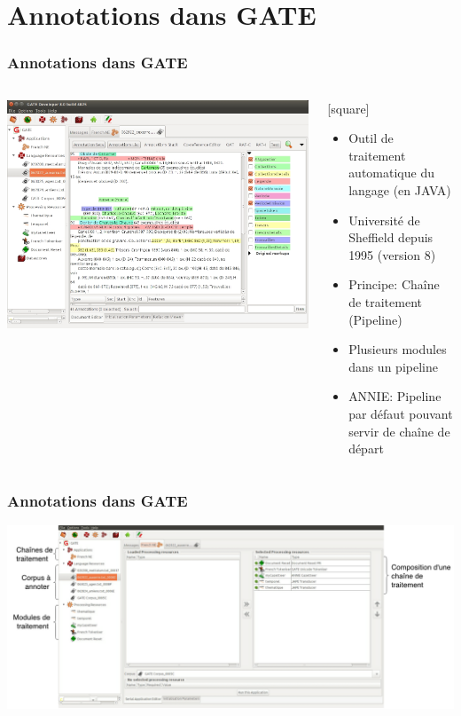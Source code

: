 \documentclass[10pt, compress]{beamer}
\begin{document}
\section{Annotations dans GATE}
\begin{frame}[fragile]
\frametitle{Annotations dans GATE}
\begin{columns}
	\begin{center}
	\includegraphics[scale=0.190]{img/gate.png} 
	\end{center}
	\begin{scriptsize}
		[square]
	\begin{itemize}
		\item{Outil de traitement automatique du langage (en JAVA)}
		\item{Université de Sheffield depuis 1995 (version 8)}
		\item{Principe: Chaîne de traitement (Pipeline)}
		\item{Plusieurs modules dans un pipeline}
		\item{ANNIE: Pipeline par défaut pouvant servir de chaîne de départ}
	\end{itemize}
	\end{scriptsize}
\end{columns}
\end{frame}

\begin{frame}[fragile]
\frametitle{Annotations dans GATE}
	\includegraphics[scale=0.21]{img/gatePresent.png} 
\end{frame}
\end{document}
